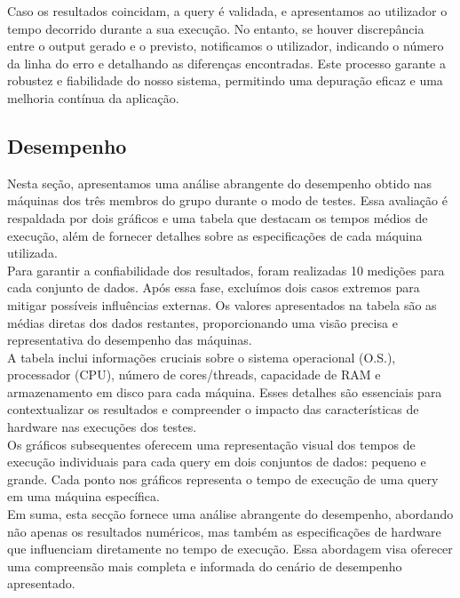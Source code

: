 \documentclass[12pt,a4paper]{article}
\begin{document}
    Caso os resultados coincidam, a query é validada, e apresentamos ao utilizador o tempo decorrido durante a sua execução. No entanto, se houver discrepância entre o output gerado e o previsto, notificamos o utilizador, indicando o número da linha do erro e detalhando as diferenças encontradas. Este processo garante a robustez e fiabilidade do nosso sistema, permitindo uma depuração eficaz e uma melhoria contínua da aplicação.

    \subsection{Desempenho}
    \hspace{0,6cm}Nesta seção, apresentamos uma análise abrangente do desempenho obtido nas máquinas dos três membros do grupo durante o modo de testes. Essa avaliação é respaldada por dois gráficos e uma tabela que destacam os tempos médios de execução, além de fornecer detalhes sobre as especificações de cada máquina utilizada.\\

    Para garantir a confiabilidade dos resultados, foram realizadas 10 medições para cada conjunto de dados. Após essa fase, excluímos dois casos extremos para mitigar possíveis influências externas. Os valores apresentados na tabela são as médias diretas dos dados restantes, proporcionando uma visão precisa e representativa do desempenho das máquinas.\\

    A tabela inclui informações cruciais sobre o sistema operacional (O.S.), processador (CPU), número de cores/threads, capacidade de RAM e armazenamento em disco para cada máquina. Esses detalhes são essenciais para contextualizar os resultados e compreender o impacto das características de hardware nas execuções dos testes.\\

    Os gráficos subsequentes oferecem uma representação visual dos tempos de execução individuais para cada query em dois conjuntos de dados: pequeno e grande. Cada ponto nos gráficos representa o tempo de execução de uma query em uma máquina específica.\\

    Em suma, esta secção fornece uma análise abrangente do desempenho, abordando não apenas os resultados numéricos, mas também as especificações de hardware que influenciam diretamente no tempo de execução. Essa abordagem visa oferecer uma compreensão mais completa e informada do cenário de desempenho apresentado.
\end{document}
